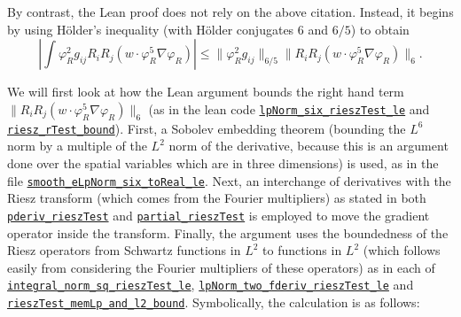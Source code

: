 \documentclass[10pt, a4paper, reqno]{amsart}
\numberwithin{equation}{section}
\renewcommand{\leq}{\leqslant}
\theoremstyle{definition}
\theoremstyle{definition}
\begin{document}
By contrast, the Lean proof does not rely on the above citation\cite{SteinSingular}. Instead, it begins by using  H\"older's inequality (with H\"older conjugates $6$ and $6/5$) to obtain 
\[\left|\int \varphi_R^2 g_{ij} R_i R_j (w \cdot \varphi_R^5 \nabla \varphi_R)\right|\leq \|\varphi_R^2 g_{ij}\|_{6/5} \|R_i R_j (w \cdot \varphi_R^5 \nabla \varphi_R)\|_6.\]

We will first look at how the Lean argument bounds the right hand term $\|R_i R_j (w \cdot \varphi_R^5 \nabla \varphi_R)\|_6$ (as in the lean code \href{https://github.com/openai/NavierStokesAndEuler/blob/f9e8bc5b38b6e212696e8a30e3e91517af887bbd/NavierStokes/R3/RieszTestOperators.lean#L223-L239}{\texttt{lpNorm\_six\_rieszTest\_le}} and \href{https://github.com/openai/NavierStokesAndEuler/blob/f9e8bc5b38b6e212696e8a30e3e91517af887bbd/NavierStokes/R3/PressureFlux.lean#L289-L305}{\texttt{riesz\_rTest\_bound}}). First, a Sobolev embedding theorem (bounding the $L^6$ norm by a multiple of the $L^2$ norm of the derivative, because this is an argument done over the spatial variables which are in three dimensions) is used, as in the file \href{https://github.com/openai/NavierStokesAndEuler/blob/f9e8bc5b38b6e212696e8a30e3e91517af887bbd/NavierStokes/R3/SmoothSobolevL6.lean#L140-L150}{\texttt{smooth\_eLpNorm\_six\_toReal\_le}}. Next, an interchange of derivatives with the Riesz transform (which comes from the Fourier multipliers) as stated in both \href{https://github.com/openai/NavierStokesAndEuler/blob/f9e8bc5b38b6e212696e8a30e3e91517af887bbd/NavierStokes/R3/RieszTestOperators.lean#L89-L100}{\texttt{pderiv\_rieszTest}} and \href{https://github.com/openai/NavierStokesAndEuler/blob/f9e8bc5b38b6e212696e8a30e3e91517af887bbd/NavierStokes/R3/RieszTestOperators.lean#L102-L104}{\texttt{partial\_rieszTest}} is employed to move the gradient operator inside the transform. Finally, the argument uses the boundedness of the Riesz operators from Schwartz functions in $L^2$ to functions in $L^2$ (which follows easily from considering the Fourier multipliers of these operators) as in each of \href{https://github.com/openai/NavierStokesAndEuler/blob/f9e8bc5b38b6e212696e8a30e3e91517af887bbd/NavierStokes/R3/RieszL2Bounds.lean}{\texttt{integral\_norm\_sq\_rieszTest\_le}}, \href{https://github.com/openai/NavierStokesAndEuler/blob/f9e8bc5b38b6e212696e8a30e3e91517af887bbd/NavierStokes/R3/RieszTestOperators.lean#L184-L214}{\texttt{lpNorm\_two\_fderiv\_rieszTest\_le}} and \href{https://github.com/openai/NavierStokesAndEuler/blob/f9e8bc5b38b6e212696e8a30e3e91517af887bbd/NavierStokes/R3/RieszL2Bounds.lean#L165-L169}{\texttt{rieszTest\_memLp\_and\_l2\_bound}}. Symbolically, the calculation is as follows:
\end{document}
